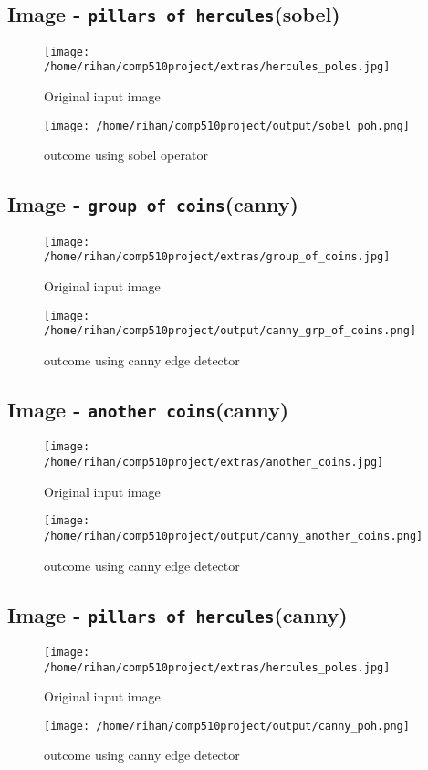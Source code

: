 \subsection{Image - \texttt{pillars of hercules}(sobel) }
\begin{figure}[h!]
  \centering
  \texttt{[image: /home/rihan/comp510project/extras/hercules\_poles.jpg]}
  \caption{Original input image}
\end{figure}
\begin{figure}[h!]
  \centering
  \texttt{[image: /home/rihan/comp510project/output/sobel\_poh.png]}
  \caption{outcome using sobel operator}
\end{figure}

\subsection{Image - \texttt{group of coins}(canny) }
\begin{figure}[h!]
  \centering
  \texttt{[image: /home/rihan/comp510project/extras/group\_of\_coins.jpg]}
  \caption{Original input image}
\end{figure}
\begin{figure}[h!]
  \centering
  \texttt{[image: /home/rihan/comp510project/output/canny\_grp\_of\_coins.png]}
  \caption{outcome using canny edge detector}
\end{figure}

\pagebreak

\subsection{Image - \texttt{another coins}(canny) }
\begin{figure}[h!]
  \centering
  \texttt{[image: /home/rihan/comp510project/extras/another\_coins.jpg]}
  \caption{Original input image}
\end{figure}
\begin{figure}[h!]
  \centering
  \texttt{[image: /home/rihan/comp510project/output/canny\_another\_coins.png]}
  \caption{outcome using canny edge detector}
\end{figure}

\subsection{Image - \texttt{pillars of hercules}(canny) }
\begin{figure}[h!]
  \centering
  \texttt{[image: /home/rihan/comp510project/extras/hercules\_poles.jpg]}
  \caption{Original input image}
\end{figure}
\begin{figure}[h!]
  \centering
  \texttt{[image: /home/rihan/comp510project/output/canny\_poh.png]}
  \caption{outcome using canny edge detector}
\end{figure}

